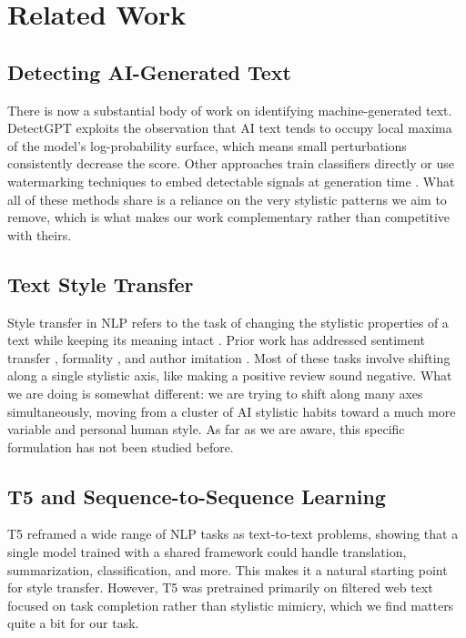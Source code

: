 \documentclass{article}
\begin{document}
\section{Related Work}

\subsection{Detecting AI-Generated Text}

There is now a substantial body of work on identifying machine-generated text. DetectGPT \cite{mitchell2023detectgpt} exploits the observation that AI text tends to occupy local maxima of the model's log-probability surface, which means small perturbations consistently decrease the score. Other approaches train classifiers directly \cite{guo2023close} or use watermarking techniques to embed detectable signals at generation time \cite{tang2023science}. What all of these methods share is a reliance on the very stylistic patterns we aim to remove, which is what makes our work complementary rather than competitive with theirs.

\subsection{Text Style Transfer}

Style transfer in NLP refers to the task of changing the stylistic properties of a text while keeping its meaning intact \cite{jin2022deep}. Prior work has addressed sentiment transfer \cite{shen2017style}, formality \cite{rao2018dear}, and author imitation \cite{wegmann2022author}. Most of these tasks involve shifting along a single stylistic axis, like making a positive review sound negative. What we are doing is somewhat different: we are trying to shift along many axes simultaneously, moving from a cluster of AI stylistic habits toward a much more variable and personal human style. As far as we are aware, this specific formulation has not been studied before.

\subsection{T5 and Sequence-to-Sequence Learning}

T5 \cite{raffel2020exploring} reframed a wide range of NLP tasks as text-to-text problems, showing that a single model trained with a shared framework could handle translation, summarization, classification, and more. This makes it a natural starting point for style transfer. However, T5 was pretrained primarily on filtered web text focused on task completion rather than stylistic mimicry, which we find matters quite a bit for our task.
\end{document}

